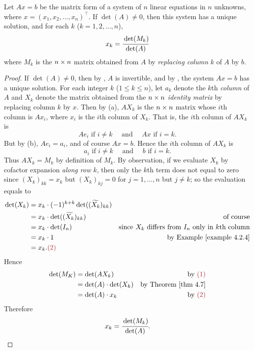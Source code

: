 \begin{theorem} \label{thm 4.9}
Let \(Ax = b\) be the matrix form of a system of \(n\) linear equations in \(n\) unknowns, where \(x = (x_1, x_2, ... , x_n)^\top\).
If \(\det(A) \ne 0\), then this system has a unique solution, and for each \(k\) (\(k = 1, 2, ..., n\)),
\[
    x_k = \cfrac{\det(M_k)}{\det(A)}
\]
where \(M_k\) is the \(n \times n\) matrix obtained from \(A\) by \emph{replacing column} \(k\) of \(A\) by \(b\).
\end{theorem}

\begin{proof}
If \(\det(A) \ne 0\), then by , \(A\) is invertible, and by , the system \(Ax = b\) has a unique solution.
For each integer \(k\) (\(1 \le k \le n\)), let \(a_k\) denote the \(k\)th \emph{column} of \(A\) and \(X_k\) denote the matrix obtained from the \(n \times n\) \emph{identity matrix} by replacing column \(k\) by \(x\).
Then by (a), \(A X_k\) is the \(n \times n\) matrix whose \(i\)th column is \(A x_i\), where \(x_i\) is the \(i\)th column of \(X_k\).
That is, the \(i\)th column of \(A X_k\) is
\[
    A e_i \text{ if } i \ne k \quad \text{ and } \quad Ax \text{ if } i = k.
\]
But by (b), \(A e_i = a_i\), and of course \(Ax = b\).
Hence the \(i\)th column of \(A X_k\) is
\[
    a_i \text{ if } i \ne k \quad \text{ and } \quad b \text{ if } i = k.
\]
Thus \(AX_k = M_k\)  by definition of \(M_k\).
By observation, if we evaluate \(X_k\) by cofactor expansion \emph{along row \(k\)}, then only the \(k\)th term does not equal to zero since \((X_k)_{kk} = x_k\) but \((X_k)_{kj} = 0\) for \(j = 1, ..., n\) but \(j \ne k\); so the evaluation equals to
\begin{align*}
    \det(X_k) & = x_k \cdot (-1)^{k + k} \det((\widetilde{X_k})_{kk}) \\
              & = x_k \cdot \det((\widetilde{X_k})_{kk}) & \text{of course} \\
              & = x_k \cdot \det(I_n) & \text{since \(X_k\) differs from \(I_n\) only in \(k\)th column} \\
              & = x_k \cdot 1 & \text{by \EXAMPLE{4.2.4}} \\
              & = x_k. \text{\MAROON{(2)}}
\end{align*}
Hence
\begin{align*}
    \det(M_K) & = \det(AX_k) & \text{by \MAROON{(1)}} \\
              & = \det(A) \cdot \det(X_k) & \text{by \THM{4.7}} \\
              & = \det(A) \cdot x_k & \text{by \MAROON{(2)}}
\end{align*}
Therefore
\[
    x_k = \cfrac{\det(M_k)}{\det(A)}.
\]
\end{proof}

